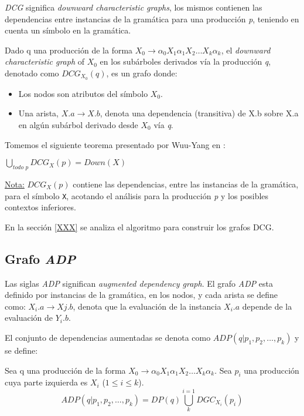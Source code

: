 \textit{DCG} significa \textit{downward characteristic graphs}, los mismos contienen las dependencias entre instancias de la gramática para una producción \textit{p}, teniendo en cuenta un símbolo en la gramática.
\begin{definition}
Dado q una producción de la forma $X_{0}\rightarrow \alpha_{0} X_{1} \alpha_{1} X_{2} \dots X_{k} \alpha_{k}$, el \textit{downward characteristic graph} of $X_{0}$ en los subárboles derivados vía la producción \textit{q}, denotado como $DCG_{X_{0}}(q)$, es un grafo donde: 
\begin{itemize}
\item Los nodos son atributos del símbolo $X_{0}$.
\item Una arista, $X.a \rightarrow X.b$, denota una dependencia (transitiva) de X.b sobre X.a en algún subárbol derivado desde $X_{0}$ vía \textit{q}.
\end{itemize}
\end{definition}
Tomemos el siguiente teorema presentado por Wuu-Yang en \cite{wuu-yang1}:
\begin{theorem}
$\bigcup\limits_{\textit{todo p}}{DCG_{X} (p) = Down (X)}$
\end{theorem}
\underline{Nota:} $DCG_{X}(p)$ contiene las dependencias, entre las instancias de la gramática, para el símbolo \texttt{X}, acotando el análisis para la producción \textit{p} y los posibles contextos inferiores.

En la sección \ref{XXX} se analiza el algoritmo para construir los grafos DCG.

\subsection{Grafo \textit{ADP}}

Las siglas \textit{ADP} significan \textit{augmented dependency graph}. El grafo \textit{ADP} esta definido por instancias de la gramática, en los nodos, y cada arista se define como: $X_{i}.a\rightarrow X{j}.b$, denota que la evaluación de la instancia \textit{$X_{i}.a$} depende de la evaluación de \textit{$Y_{i}.b$}.

El conjunto de dependencias aumentadas se denota como $ADP (q | p_{1}, p_{2}, \dots, p_{k})$ y se define:
\begin{definition}
Sea q una producción de la forma $X_{0}\rightarrow \alpha_{0} X_{1} \alpha_{1} X_{2} \dots X_{k} \alpha_{k}$. Sea $p_{i}$ una producción cuya parte izquierda es $X_{i}$ ($1\leqslant i \leqslant k$). 
\begin{equation}
ADP (q | p_{1}, p_{2}, \dots, p_{k}) = DP(q) \bigcup\limits_{k}^{i=1}{DGC_{X_{i}}} (p_{i})
\end{equation}
\end{definition}

